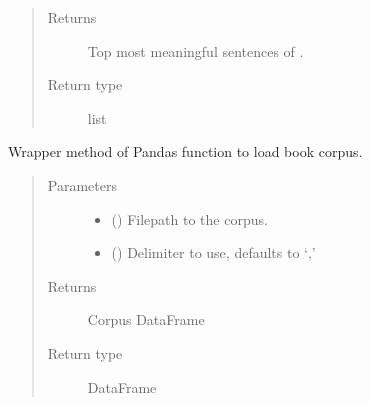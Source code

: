 \documentclass[letterpaper,10pt,english]{sphinxmanual}
\begin{document}
\begin{fulllineitems}
\begin{quote}
\begin{description}
\begin{itemize}
\end{itemize}

\item[{Returns}] \leavevmode
Top  most meaningful sentences of .

\item[{Return type}] \leavevmode
list

\end{description}\end{quote}

\end{fulllineitems}


\begin{fulllineitems}
\label{\detokenize{code:code_utils.utils.load_corpus}}
Wrapper method of Pandas  function to load book corpus.
\begin{quote}\begin{description}
\item[{Parameters}] \leavevmode\begin{itemize}
\item {} 
 () \textendash{} Filepath to the corpus.

\item {} 
 (\sphinxstyleliteralemphasis{\sphinxupquote{, }}) \textendash{} Delimiter to use, defaults to ‘,’

\end{itemize}

\item[{Returns}] \leavevmode
Corpus DataFrame

\item[{Return type}] \leavevmode
DataFrame

\end{description}\end{quote}

\end{fulllineitems}
\end{document}
